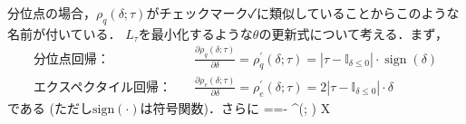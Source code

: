 分位点の場合，$\rho_q(\delta; \tau)$がチェックマーク✓に類似していることからこのような名前が付いている．
$L_\tau$を最小化するような$\theta$の更新式について考える．まず，
\begin{align}
\text{分位点回帰：}&\quad
\frac{\partial \rho_q(\delta; \tau)}{\partial \delta}= \rho_q^{\prime}(\delta; \tau)=\left|\tau-\mathbb{I}_{\delta \leq 0}\right| \cdot
\operatorname{sign}(\delta)\\
\text{エクスペクタイル回帰：}&\quad
\frac{\partial \rho_e(\delta; \tau)}{\partial \delta}= \rho_e^{\prime}(\delta; \tau)=2\left|\tau-\mathbb{I}_{\delta \leq 0}\right| \cdot
\delta
\end{align}
である (ただし$\text{sign}(\cdot)$は符号関数)．さらに
=\frac{\partial \delta(\theta)}{\partial \theta}=- \rho^{\prime}(\delta; \tau) X
 
